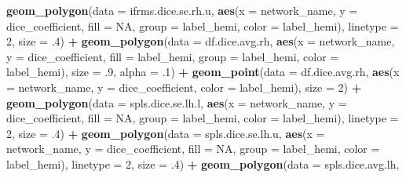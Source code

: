 \documentclass[
]{article}
\newenvironment{Shaded}{\begin{snugshade}}{\end{snugshade}}
\newcommand{\DataTypeTok}[1]{\textcolor[rgb]{0.13,0.29,0.53}{#1}}
\newcommand{\DecValTok}[1]{\textcolor[rgb]{0.00,0.00,0.81}{#1}}
\newcommand{\FloatTok}[1]{\textcolor[rgb]{0.00,0.00,0.81}{#1}}
\newcommand{\KeywordTok}[1]{\textcolor[rgb]{0.13,0.29,0.53}{\textbf{#1}}}
\newcommand{\NormalTok}[1]{#1}
\newcommand{\OperatorTok}[1]{\textcolor[rgb]{0.81,0.36,0.00}{\textbf{#1}}}
\newcommand{\OtherTok}[1]{\textcolor[rgb]{0.56,0.35,0.01}{#1}}
\newcommand{\StringTok}[1]{\textcolor[rgb]{0.31,0.60,0.02}{#1}}
\begin{document}
\begin{Shaded}
\begin{Highlighting}[]
{{{{{{{{{{{{\StringTok{  }\KeywordTok{geom_polygon}\NormalTok{(}\DataTypeTok{data =}\NormalTok{ ifrms.dice.se.rh.u, }
               \KeywordTok{aes}\NormalTok{(}\DataTypeTok{x =}\NormalTok{ network_name, }\DataTypeTok{y =}\NormalTok{ dice_coefficient, }\DataTypeTok{fill =} \OtherTok{NA}\NormalTok{, }\DataTypeTok{group =}\NormalTok{ label_hemi, }\DataTypeTok{color =}\NormalTok{ label_hemi), }
               \DataTypeTok{linetype =} \DecValTok{2}\NormalTok{, }\DataTypeTok{size =} \FloatTok{.4}\NormalTok{) }\OperatorTok{+}\StringTok{ }
\StringTok{  }\KeywordTok{geom_polygon}\NormalTok{(}\DataTypeTok{data =}\NormalTok{ df.dice.avg.rh, }
               \KeywordTok{aes}\NormalTok{(}\DataTypeTok{x =}\NormalTok{ network_name, }\DataTypeTok{y =}\NormalTok{ dice_coefficient, }
                   \DataTypeTok{fill =}\NormalTok{ label_hemi, }\DataTypeTok{group =}\NormalTok{ label_hemi, }\DataTypeTok{color =}\NormalTok{ label_hemi), }
               \DataTypeTok{size =} \FloatTok{.9}\NormalTok{, }\DataTypeTok{alpha =} \FloatTok{.1}\NormalTok{) }\OperatorTok{+}
\StringTok{  }\KeywordTok{geom_point}\NormalTok{(}\DataTypeTok{data =}\NormalTok{ df.dice.avg.rh, }
             \KeywordTok{aes}\NormalTok{(}\DataTypeTok{x =}\NormalTok{ network_name, }\DataTypeTok{y =}\NormalTok{ dice_coefficient, }\DataTypeTok{color =}\NormalTok{ label_hemi), }
             \DataTypeTok{size =} \DecValTok{2}\NormalTok{) }\OperatorTok{+}
\StringTok{  }
\StringTok{  }
\StringTok{  }\KeywordTok{geom_polygon}\NormalTok{(}\DataTypeTok{data =}\NormalTok{ spls.dice.se.lh.l, }
               \KeywordTok{aes}\NormalTok{(}\DataTypeTok{x =}\NormalTok{ network_name, }\DataTypeTok{y =}\NormalTok{ dice_coefficient, }\DataTypeTok{fill =} \OtherTok{NA}\NormalTok{, }\DataTypeTok{group =}\NormalTok{ label_hemi, }\DataTypeTok{color =}\NormalTok{ label_hemi), }
               \DataTypeTok{linetype =} \DecValTok{2}\NormalTok{, }\DataTypeTok{size =} \FloatTok{.4}\NormalTok{) }\OperatorTok{+}\StringTok{ }
\StringTok{  }\KeywordTok{geom_polygon}\NormalTok{(}\DataTypeTok{data =}\NormalTok{ spls.dice.se.lh.u, }
               \KeywordTok{aes}\NormalTok{(}\DataTypeTok{x =}\NormalTok{ network_name, }\DataTypeTok{y =}\NormalTok{ dice_coefficient, }\DataTypeTok{fill =} \OtherTok{NA}\NormalTok{, }\DataTypeTok{group =}\NormalTok{ label_hemi, }\DataTypeTok{color =}\NormalTok{ label_hemi), }
               \DataTypeTok{linetype =} \DecValTok{2}\NormalTok{, }\DataTypeTok{size =} \FloatTok{.4}\NormalTok{) }\OperatorTok{+}\StringTok{ }
\StringTok{  }\KeywordTok{geom_polygon}\NormalTok{(}\DataTypeTok{data =}\NormalTok{ spls.dice.avg.lh, }
}}}}}}}}}}}}
\end{Highlighting}
\end{Shaded}
\end{document}
